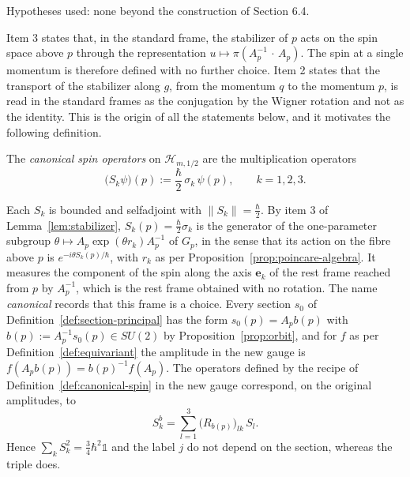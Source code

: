 \noindent Hypotheses used: none beyond the construction of Section 6.4.

Item 3 states that, in the standard frame, the stabilizer of $p$ acts on the spin space above $p$ through the representation $u\mapsto\pi(A_p^{-1}\,\cdot\,A_p)$. The spin at a single momentum is therefore defined with no further choice. Item 2 states that the transport of the stabilizer along $g$, from the momentum $q$ to the momentum $p$, is read in the standard frames as the conjugation by the Wigner rotation and not as the identity. This is the origin of all the statements below, and it motivates the following definition.

\begin{definition}\label{def:canonical-spin}
	The \emph{canonical spin operators} on $\mathcal{H}_{m,1/2}$ are the multiplication operators
	\begin{equation*}
		\big(S_k\psi\big)(p):=\frac{\hbar}{2}\,\sigma_k\,\psi(p),\qquad k=1,2,3.
	\end{equation*}
\end{definition}

\begin{remark}\label{rem:canonical-spin}
	Each $S_k$ is bounded and selfadjoint with $\|S_k\|=\frac\hbar2$. By item 3 of Lemma~\ref{lem:stabilizer}, $S_k(p)=\frac\hbar2\sigma_k$ is the generator of the one-parameter subgroup $\theta\mapsto A_p\exp(\theta r_k)A_p^{-1}$ of $G_p$, in the sense that its action on the fibre above $p$ is $e^{-i\theta S_k(p)/\hbar}$, with $r_k$ as per Proposition~\ref{prop:poincare-algebra}. It measures the component of the spin along the axis $\mathbf{e}_k$ of the rest frame reached from $p$ by $A_p^{-1}$, which is the rest frame obtained with no rotation. The name \emph{canonical} records that this frame is a choice. Every section $s_0$ of Definition~\ref{def:section-principal} has the form $s_0(p)=A_pb(p)$ with $b(p):=A_p^{-1}s_0(p)\in SU(2)$ by Proposition~\ref{prop:orbit}, and for $f$ as per Definition~\ref{def:equivariant} the amplitude in the new gauge is $f(A_pb(p))=b(p)^{-1}f(A_p)$. The operators defined by the recipe of Definition~\ref{def:canonical-spin} in the new gauge correspond, on the original amplitudes, to
	\begin{equation*}
		S^b_k=\sum_{l=1}^3\big(R_{b(p)}\big)_{lk}\,S_l.
	\end{equation*}
	Hence $\sum_kS_k^2=\frac34\hbar^2\mathbb{1}$ and the label $j$ do not depend on the section, whereas the triple does.
\end{remark}

